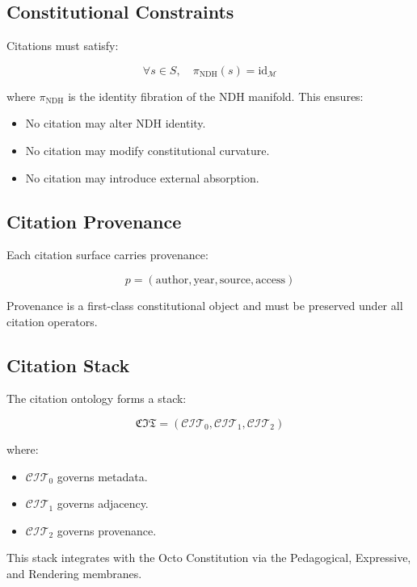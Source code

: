 
\subsection{Constitutional Constraints}

Citations must satisfy:

\[
\forall s \in S,\quad
\pi_{\mathrm{NDH}}(s) = \mathrm{id}_{\mathcal{M}}
\]

where $\pi_{\mathrm{NDH}}$ is the identity fibration of the NDH
manifold. This ensures:

\begin{itemize}
    \item No citation may alter NDH identity.
    \item No citation may modify constitutional curvature.
    \item No citation may introduce external absorption.
\end{itemize}


\subsection{Citation Provenance}

Each citation surface carries provenance:

\[
p = (\mathrm{author}, \mathrm{year}, \mathrm{source}, \mathrm{access})
\]

Provenance is a first-class constitutional object and must be preserved
under all citation operators.


\subsection{Citation Stack}

The citation ontology forms a stack:

\[
\mathfrak{CIT} =
(\mathcal{CIT}_0, \mathcal{CIT}_1, \mathcal{CIT}_2)
\]

where:

\begin{itemize}
    \item $\mathcal{CIT}_0$ governs metadata.
    \item $\mathcal{CIT}_1$ governs adjacency.
    \item $\mathcal{CIT}_2$ governs provenance.
\end{itemize}

This stack integrates with the Octo Constitution via the Pedagogical,
Expressive, and Rendering membranes.


